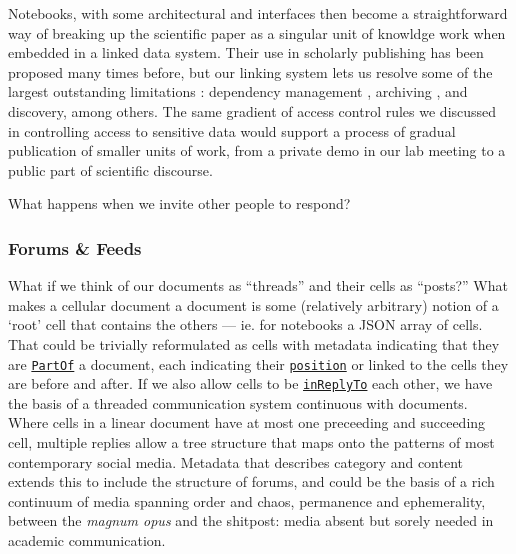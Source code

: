 Notebooks, with some architectural and interfaces then become a
straightforward way of breaking up the scientific paper as a singular
unit of knowldge work when embedded in a linked data system. Their use
in scholarly publishing has been proposed many times before, but our
linking system lets us resolve some of the largest outstanding
limitations \citep{chattopadhyayWhatWrongComputational2020} :
dependency management \citep{ruleTenSimpleRules2019} , archiving
\citep{woffordJupyterNotebooksDiscovery2020} , and discovery,
among others. The same gradient of access control rules we discussed in
controlling access to sensitive data would support a process of gradual
publication of smaller units of work, from a private demo in our lab
meeting to a public part of scientific discourse.

What happens when we invite other people to respond?

\hypertarget{forums-feeds}{%
\subsubsection{Forums \& Feeds}\label{forums-feeds}}

What if we think of our documents as ``threads'' and their cells as
``posts?'' What makes a cellular document a document is some (relatively
arbitrary) notion of a `root' cell that contains the others --- ie. for
notebooks a JSON array of cells. That could be trivially reformulated as
cells with metadata indicating that they are
\href{https://schema.org/isPartOf}{\texttt{PartOf}} a document, each
indicating their \href{https://schema.org/position}{\texttt{position}}
or linked to the cells they are before and after. If we also allow cells
to be
\href{https://www.w3.org/TR/activitystreams-vocabulary/\#dfn-inreplyto}{\texttt{inReplyTo}}
each other, we have the basis of a threaded communication system
continuous with documents. Where cells in a linear document have at most
one preceeding and succeeding cell, multiple replies allow a tree
structure that maps onto the patterns of most contemporary social media.
Metadata that describes category and content extends this to include the
structure of forums, and could be the basis of a rich continuum of media
spanning order and chaos, permanence and ephemerality, between the
\emph{magnum opus} and the shitpost: media absent but sorely needed in
academic communication.


